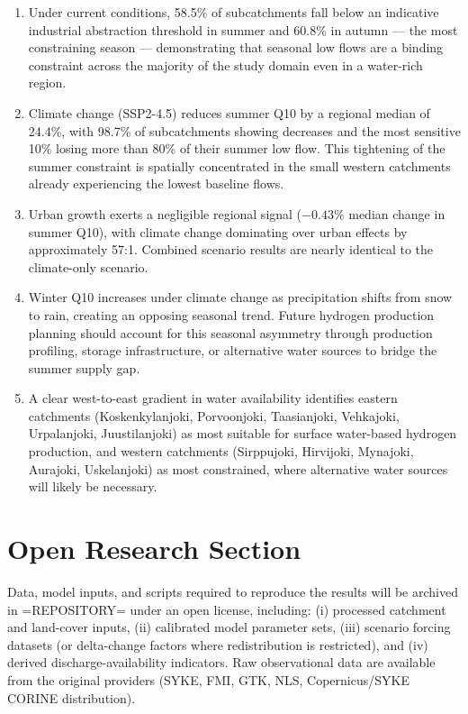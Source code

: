 \documentclass[draft]{agujournal2019}
\begin{document}
\begin{enumerate}
    \item Under current conditions, 58.5\% of subcatchments fall below an indicative industrial abstraction threshold in summer and 60.8\% in autumn — the most constraining season — demonstrating that seasonal low flows are a binding constraint across the majority of the study domain even in a water-rich region.
    \item Climate change (SSP2-4.5) reduces summer Q10 by a regional median of 24.4\%, with 98.7\% of subcatchments showing decreases and the most sensitive 10\% losing more than 80\% of their summer low flow. This tightening of the summer constraint is spatially concentrated in the small western catchments already experiencing the lowest baseline flows.
    \item Urban growth exerts a negligible regional signal ($-0.43\%$ median change in summer Q10), with climate change dominating over urban effects by approximately 57:1. Combined scenario results are nearly identical to the climate-only scenario.
    \item Winter Q10 increases under climate change as precipitation shifts from snow to rain, creating an opposing seasonal trend. Future hydrogen production planning should account for this seasonal asymmetry through production profiling, storage infrastructure, or alternative water sources to bridge the summer supply gap.
    \item A clear west-to-east gradient in water availability identifies eastern catchments (Koskenkylanjoki, Porvoonjoki, Taasianjoki, Vehkajoki, Urpalanjoki, Juustilanjoki) as most suitable for surface water-based hydrogen production, and western catchments (Sirppujoki, Hirvijoki, Mynajoki, Aurajoki, Uskelanjoki) as most constrained, where alternative water sources will likely be necessary.
\end{enumerate}

\section*{Open Research Section}
Data, model inputs, and scripts required to reproduce the results will be archived in =REPOSITORY= under an open license, including: (i) processed catchment and land-cover inputs, (ii) calibrated model parameter sets, (iii) scenario forcing datasets (or delta-change factors where redistribution is restricted), and (iv) derived discharge-availability indicators. Raw observational data are available from the original providers (SYKE, FMI, GTK, NLS, Copernicus/SYKE CORINE distribution). %
\end{document}
